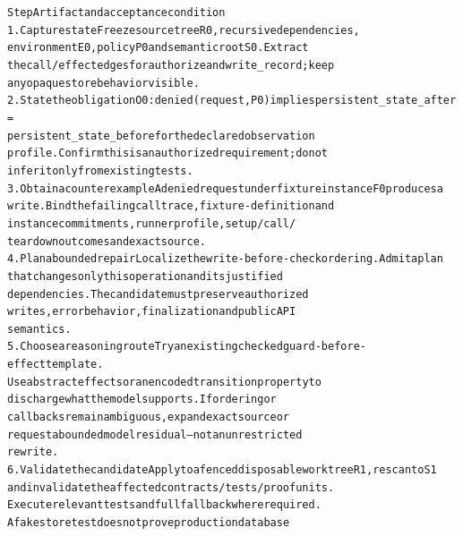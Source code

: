\documentclass{article}
\begin{document}
\begingroup\fontsize{7}{8.4}\selectfont
\begin{alltt}
Step                                        Artifact and acceptance condition
1. Capture state                            Freeze source tree R0, recursive dependencies,
                                            environment E0, policy P0 and semantic root S0. Extract
                                            the call/effect edges for authorize and write\_record; keep
                                            any opaque store behavior visible.
2. State the obligation                     O0: denied(request, P0) implies persistent\_state\_after =
                                            persistent\_state\_before for the declared observation
                                            profile. Confirm this is an authorized requirement; do not
                                            infer it only from existing tests.
3. Obtain a counterexample                  A denied request under fixture instance F0 produces a
                                            write. Bind the failing call trace, fixture-definition and
                                            instance commitments, runner profile, setup/call/
                                            teardown outcomes and exact source.
4. Plan a bounded repair                    Localize the write-before-check ordering. Admit a plan
                                            that changes only this operation and its justified
                                            dependencies. The candidate must preserve authorized
                                            writes, error behavior, finalization and public API
                                            semantics.
5. Choose a reasoning route                 Try an existing checked guard-before-effect template.
                                            Use abstract effects or an encoded transition property to
                                            discharge what the model supports. If ordering or
                                            callbacks remain ambiguous, expand exact source or
                                            request a bounded model residual—not an unrestricted
                                            rewrite.
6. Validate the candidate                   Apply to a fenced disposable worktree R1, rescan to S1
                                            and invalidate the affected contracts/tests/proof units.
                                            Execute relevant tests and full fallback where required.
                                            A fake store test does not prove production database

\end{alltt}
\end{document}
